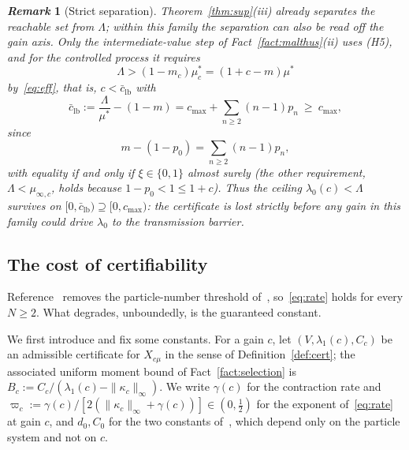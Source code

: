 \documentclass[letterpaper, 10pt, conference]{ieeeconf}
\newtheorem{remark}{\it \textbf{Remark}}
\newcommand{\Lbar}{\Lambda}
\newcommand{\rev}[1]{#1}
\newcommand{\pl}[1]{#1}
\newcommand{\ed}[1]{#1}
\newcommand{\edm}[1]{#1}
\begin{document}
\begin{remark}[\rev{Strict separation}]
\label{prop:separation}
\rev{Theorem~\ref{thm:sup}(iii) already separates the reachable set from
$\Lbar$; within this family the separation can also be read off the gain axis.
Only the intermediate-value step of Fact~\ref{fact:malthus}(ii) uses (H5), and
for the controlled process it requires
\[
\Lbar>(1-m_c)\mu_c^\ast=(1+c-m)\mu^\ast
\]
by~\eqref{eq:eff}, that is,
$c<\bar c_{\mathrm{lb}}$ with}
\begin{equation}
\rev{\bar c_{\mathrm{lb}}:=\frac{\Lbar}{\mu^\ast}-(1-m)
=c_{\max}+\edm{\sum_{n\ge2}}(n-1)p_n\ \ge\ c_{\max},}
\label{eq:sep}
\end{equation}
\rev{since 
\[
m-(1-p_0)=\edm{\sum_{n\ge2}}(n-1)p_n,
\]
with equality if and only if $\xi\in\{0,1\}$ almost surely (the other requirement,
$\Lbar<\mu_{\infty,c}$, holds because $1-p_0<1\le1+c$). Thus the ceiling
$\lambda_0(c)<\Lbar$ survives on
$[0,\bar c_{\mathrm{lb}})\supseteq[0,c_{\max})$: the certificate is lost
strictly before any gain in this family could drive $\lambda_0$ to the
transmission barrier.}
\end{remark}

\subsection{\pl{The cost of certifiability}}
\label{sec:cost}
Reference~\cite{companion} removes the particle-number threshold
of~\cite[Thm.~2.3]{cv1}, so~\eqref{eq:rate} holds for every $N\ge2$. What
degrades, unboundedly, is the guaranteed constant.


\rev{We first introduce and fix some constants. \ed{For a gain $c$, let $(V,\lambda_1(c),C_c)$ be an admissible certificate for $X_{c\mu}$ in the sense of Definition~\ref{def:cert};} the associated uniform moment bound of Fact~\ref{fact:selection} is $B_c:=C_c/(\lambda_1(c)-\|\kappa_c\|_\infty)$. We write $\gamma(c)$ for the contraction rate and $\varpi_c:=\gamma(c)/[2(\|\kappa_c\|_\infty+\gamma(c))]\in(0,\tfrac12)$ for the exponent of~\eqref{eq:rate} at gain $c$, and $d_0,C_0$ for the two constants of~\cite[\S4.3]{cv1}, which depend only on the particle system and not on $c$.}
\end{document}
